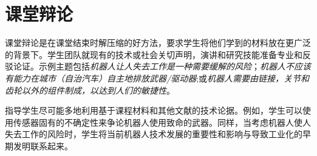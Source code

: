 


\section{课堂辩论} 
\label{sec:debates}
课堂辩论是在课堂结束时解压缩的好方法，要求学生将他们学到的材料放在更广泛的背景下。学生团队就现有的技术或社会关切声明，演讲和研究技能准备专业和反驳论证。示例主题包括\emph{机器人让人失去工作是一种需要缓解的风险}；\emph{机器人不应该有能力在城市（自治汽车）自主地排放武器/驱动器};或\emph{机器人需要由链接，关节和齿轮以外的组件制成，以达到人们的敏捷性}。

指导学生尽可能多地利用基于课程材料和其他文献的技术论据。例如，学生可以使用传感器固有的不确定性来争论机器人使用致命的武器。同样，当考虑机器人使人失去工作的风险时，学生将当前机器人技术发展的重要性和影响与导致工业化的早期发明联系起来。

